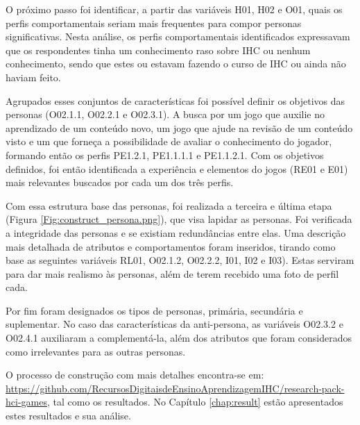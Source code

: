 O próximo passo foi identificar, a partir das variáveis H01, H02 e O01, quais os perfis comportamentais seriam mais frequentes para compor personas significativas. Nesta análise, os perfis comportamentais identificados expressavam que os respondentes tinha um conhecimento raso sobre IHC ou nenhum conhecimento, sendo que estes ou estavam fazendo o curso de IHC ou ainda não haviam feito.

Agrupados esses conjuntos de características foi possível definir os objetivos das personas (O02.1.1, O02.2.1 e O02.3.1). A busca por um jogo que auxilie no aprendizado de um conteúdo novo, um jogo que ajude na revisão de um conteúdo visto e um que forneça a possibilidade de avaliar o conhecimento do jogador, formando então os perfis PE1.2.1, PE1.1.1.1 e PE1.1.2.1. Com os objetivos definidos, foi então identificada a experiência e elementos do jogos (RE01 e E01) mais relevantes buscados por cada um dos três perfis. 

Com essa estrutura base das personas, foi realizada a terceira e última etapa (Figura \ref{Fig:construct_persona.png}), que visa lapidar as personas. Foi verificada a integridade das personas e se existiam redundâncias entre elas. Uma descrição mais detalhada de atributos e comportamentos foram inseridos, tirando como base as seguintes variáveis RL01, O02.1.2, O02.2.2, I01, I02 e I03). Estas serviram para dar mais realismo às personas, além de terem recebido uma foto de perfil cada. 

Por fim foram designados os tipos de personas, primária, secundária e suplementar. No caso das características da anti-persona, as variáveis O02.3.2 e O02.4.1 auxiliaram a complementá-la, além dos atributos que foram considerados como irrelevantes para as outras personas.

O processo de construção com mais detalhes encontra-se em: 
\url{https://github.com/RecursosDigitaisdeEnsinoAprendizagemIHC/research-pack-hci-games}, tal como os resultados. No Capítulo \ref{chap:result} estão apresentados estes resultados e sua análise.

